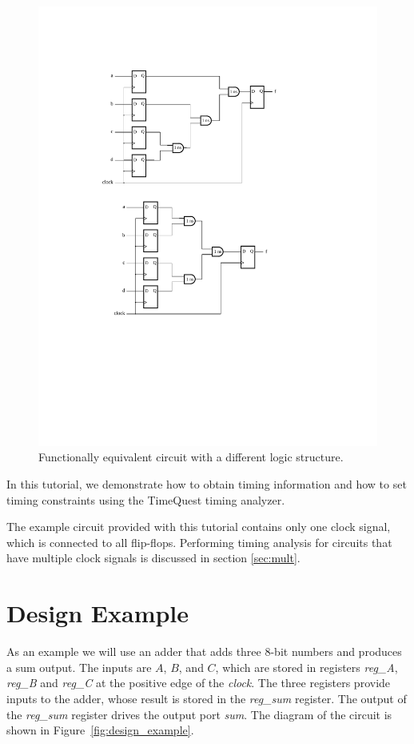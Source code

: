 \documentclass[11pt, twoside, pdftex]{article}
\begin{document}
\begin{figure}[H]
\begin{center}
\includegraphics[scale=.75]{figures/sample_circuit_balanced.pdf}
\end{center}
\caption{Functionally equivalent circuit with a different logic structure.}
\label{fig:fmax_computation_example_optimized}
\end{figure}

In this tutorial, we demonstrate how to obtain timing information and how to set timing 
constraints using the TimeQuest timing analyzer.

The example circuit provided with this tutorial contains only one clock signal, which is
connected to all flip-flops. Performing timing analysis for circuits that have
multiple clock signals is discussed in section \ref{sec:mult}.

\section{Design Example}
As an example we will use an adder that adds three 8-bit numbers and produces a sum output. The inputs are $A$, $B$, and $C$, which are
stored in registers {\it reg\_A}, {\it reg\_B} and {\it reg\_C} at the positive edge of the {\it clock}. The three registers provide inputs
to the adder, whose result is stored in the {\it reg\_sum} register. The output of the {\it reg\_sum} register drives
the output port {\it sum}. The diagram of the circuit is shown in Figure~\ref{fig:design_example}.
\end{document}
